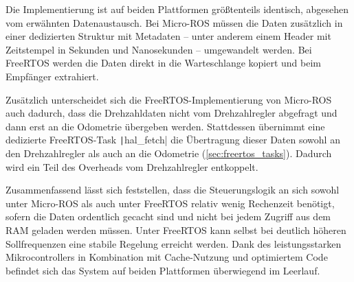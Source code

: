 Die Implementierung ist auf beiden Plattformen größtenteils identisch, abgesehen
vom erwähnten Datenaustausch. Bei Micro-ROS müssen die Daten zusätzlich in einer
dedizierten Struktur mit Metadaten -- unter anderem einem Header mit Zeitstempel
in Sekunden und Nanosekunden -- umgewandelt werden. Bei FreeRTOS werden die
Daten direkt in die Warteschlange kopiert und beim Empfänger extrahiert.

Zusätzlich unterscheidet sich die FreeRTOS-Implementierung von Micro-ROS auch
dadurch, dass die Drehzahldaten nicht vom Drehzahlregler abgefragt und dann erst
an die Odometrie übergeben werden. Stattdessen übernimmt eine dedizierte
FreeRTOS-Task \texttt|hal_fetch| die Übertragung dieser Daten sowohl an
den Drehzahlregler als auch an die Odometrie (\ref{sec:freertos_tasks}). Dadurch
wird ein Teil des Overheads vom Drehzahlregler entkoppelt.

Zusammenfassend lässt sich feststellen, dass die Steuerungslogik an sich sowohl
unter Micro-ROS als auch unter FreeRTOS relativ wenig Rechenzeit benötigt,
sofern die Daten ordentlich gecacht sind und nicht bei jedem Zugriff aus dem RAM
geladen werden müssen. Unter FreeRTOS kann selbst bei deutlich höheren
Sollfrequenzen eine stabile Regelung erreicht werden. Dank des leistungsstarken
Mikrocontrollers in Kombination mit Cache-Nutzung und optimiertem Code befindet
sich das System auf beiden Plattformen überwiegend im Leerlauf.
